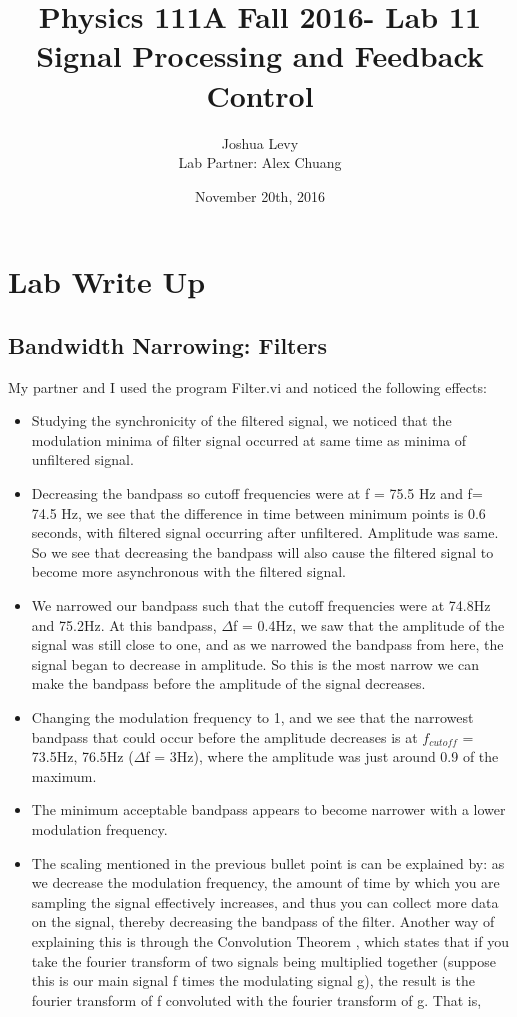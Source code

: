 \documentclass{article}
\title{Physics 111A Fall 2016- Lab 11\\Signal Processing and Feedback Control}
\author{Joshua Levy\\Lab Partner: Alex Chuang}
\date{November 20th, 2016}
\begin{document}
\maketitle

\section{Lab Write Up}
\subsection{Bandwidth Narrowing: Filters}
    My partner and I used the program Filter.vi and noticed the following effects:
    \begin{itemize}
        \item Studying the synchronicity of the filtered signal, we noticed that the modulation minima of filter signal occurred at same time as minima of unfiltered signal.
        \item Decreasing the bandpass so cutoff frequencies were at f = 75.5 Hz and f= 74.5 Hz, we see that the difference in time between minimum points is 0.6 seconds, with filtered signal occurring after unfiltered. Amplitude was same. So we see that decreasing the bandpass will also cause the filtered signal to become more asynchronous with the filtered signal.
        \item We narrowed our bandpass such that the cutoff frequencies were at 74.8Hz and 75.2Hz. At this bandpass, $\Delta$f = 0.4Hz, we saw that the amplitude of the signal was still close to one, and as we narrowed the bandpass from here, the signal began to decrease in amplitude. So this is the most narrow we can make the bandpass before the amplitude of the signal decreases.
        \item Changing the modulation frequency to 1, and we see that the narrowest bandpass that could occur before the amplitude decreases is at $f_{cutoff}$ = 73.5Hz, 76.5Hz ($\Delta$f = 3Hz), where the amplitude was just around 0.9 of the maximum.
        \item The minimum acceptable bandpass appears to become narrower with a lower modulation frequency.
        \item The scaling mentioned in the previous bullet point is can be explained by: as we decrease the modulation frequency, the amount of time by which you are sampling the signal effectively increases, and thus you can collect more data on the signal, thereby decreasing the bandpass of the filter. Another way of explaining this is through the Convolution Theorem \cite{conv}, which states that if you take the fourier transform of two signals being multiplied together (suppose this is our main signal f times the modulating signal g), the result is the fourier transform of f convoluted with the fourier transform of g. That is,

\end{itemize}
\end{document}
